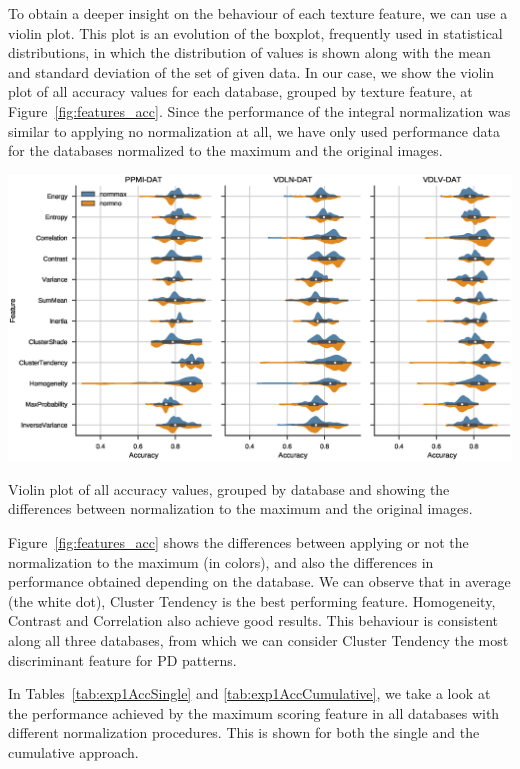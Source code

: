 To obtain a deeper insight on the behaviour of each texture feature, we can use a violin plot. This plot is an evolution of the boxplot, frequently used in statistical distributions, in which the distribution of values is shown along with the mean and standard deviation of the set of given data. In our case, we show the violin plot of all accuracy values for each database, grouped by texture feature, at Figure~\ref{fig:features_acc}. Since the performance of the integral normalization was similar to applying no normalization at all, we have only used performance data for the databases normalized to the maximum and the original images. 

\begin{bigfigure}
	\includegraphics[width=\textheight]{Graphics/ch5/features_acc.eps}\label{fig:acc_distances}
	\caption[Violin plot of all accuracy values, grouped by database.]{Violin plot of all accuracy values, grouped by database and showing the differences between normalization to the maximum and the original images.}
	\label{fig:features_acc}
\end{bigfigure}

Figure~\ref{fig:features_acc} shows the differences between applying or not the normalization to the maximum (in colors), and also the differences in performance obtained depending on the database. We can observe that in average (the white dot), Cluster Tendency is the best performing feature. Homogeneity, Contrast and Correlation also achieve good results. This behaviour is consistent along all three databases, from which we can consider Cluster Tendency the most discriminant feature for \ac{PD} patterns. 

In Tables~\ref{tab:exp1AccSingle} and \ref{tab:exp1AccCumulative}, we take a look at the performance achieved by the maximum scoring feature in all databases with different normalization procedures. This is shown for both the single and the cumulative approach. 


